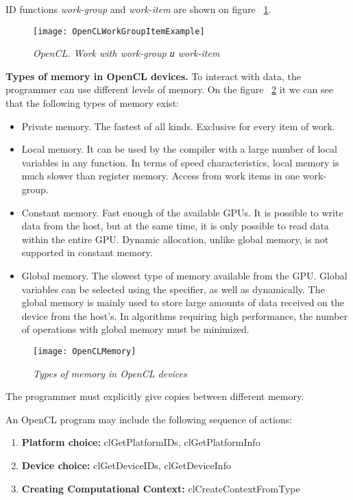 {ID functions \textit{work-group} and \textit{work-item} are shown on  figure ~\ref{OpenCLWorkGroupItemExample:image}.
	\begin{figure}[H]
		\texttt{[image: OpenCLWorkGroupItemExample]}
		\caption{\textit{OpenCL. Work with  work-group и work-item}}
		\label{OpenCLWorkGroupItemExample:image}
	\end{figure}
	\par\textbf{Types of memory in OpenCL devices.} To interact with data, the programmer can use different levels of memory. On the figure ~\ref{OpenCLMemory:image} it we can see that the following types of memory exist:
	\begin{itemize}
		\item Private memory. The fastest of all kinds. Exclusive for every item of work.
		\item Local memory. It can be used by the compiler with a large number of local variables in any function. In terms of speed characteristics, local memory is much slower than register memory. Access from work items in one work-group.
		\item Constant memory. Fast enough of the available GPUs. It is possible to write data from the host, but at the same time, it is only possible to read data within the entire GPU. Dynamic allocation, unlike global memory, is not supported in constant memory.
		\item Global memory. The slowest type of memory available from the GPU. Global variables can be selected using the specifier, as well as dynamically. The global memory is mainly used to store large amounts of data received on the device from the host’s. In algorithms requiring high performance, the number of operations with global memory must be minimized.
	\end{itemize}	
	\begin{figure}[H]
		\texttt{[image: OpenCLMemory]}
		\caption{\textit{Types of memory in OpenCL devices}}
		\label{OpenCLMemory:image}
	\end{figure}
	The programmer must explicitly give copies between different memory.
		\par An OpenCL program may include the following sequence of actions:
		\begin{enumerate}
			\item\textbf{Platform choice:} clGetPlatformIDs, clGetPlatformInfo
			\item\textbf{Device choice:} clGetDeviceIDs, clGetDeviceInfo
			\item\textbf{Creating Computational Context:} clCreateContextFromType

\end{enumerate}}
